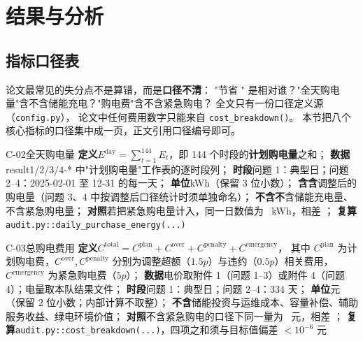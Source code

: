 
\section{结果与分析}

\subsection{指标口径表}

\begin{guideblock}
论文最常见的失分点不是算错，而是\textbf{口径不清}：
"节省 \ph" 是相对谁？"全天购电量"含不含储能充电？"购电费"含不含紧急购电？
全文只有一份口径定义源（\texttt{config.py}），
论文中任何费用数字只能来自 \texttt{cost\_breakdown()}。
本节把八个核心指标的口径集中成一页，正文引用口径编号即可。
\end{guideblock}

\begin{caliber}{C-02}{全天购电量}
\textbf{定义}\quad \(E^{\text{day}}=\sum_{t=1}^{144}E_t\)，即 144 个时段的\textbf{计划购电量}之和；%
\textbf{数据}\quad result1/2/3/4-* 中"计划购电量"工作表的逐时段列；%
\textbf{时段}\quad 问题 1：典型日；问题 2--4：2025-02-01 至 12-31 的每一天；%
\textbf{单位}\quad kWh（保留 3 位小数）；%
\textbf{含}\quad \textbf{含}调整后的购电量（问题 3、4 中按调整后口径统计时须单独命名）；%
\textbf{不含}\quad \textbf{不}含储能充电量、不含紧急购电量；%
\textbf{对照}\quad 若把紧急购电量计入，同一日数值为 \ph~kWh，相差 \ph；%
\textbf{复算}\quad \texttt{audit.py::daily\_purchase\_energy(...)}
\end{caliber}

\begin{caliber}{C-03}{总购电费用}
\textbf{定义}\quad \(C^{\text{total}}=C^{\text{plan}}+C^{\text{over}}+C^{\text{penalty}}%
        +C^{\text{emergency}}\)，%
        其中 \(C^{\text{plan}}\) 为计划购电费，\(C^{\text{over}},C^{\text{penalty}}\)%
        分别为调整超额（\(1.5p\)）与违约（\(0.5p\)）相关费用，%
        \(C^{\text{emergency}}\) 为紧急购电费（\(5p\)）；%
\textbf{数据}\quad 电价取附件 1（问题 1--3）或附件 4（问题 4）；电量取本队结果文件；%
\textbf{时段}\quad 问题 1：典型日；问题 2--4：334 天；%
\textbf{单位}\quad 元（保留 2 位小数；内部计算不取整）；%
\textbf{不含}\quad 储能投资与运维成本、容量补偿、辅助服务收益、绿电环境价值；%
\textbf{对照}\quad 不含紧急购电的口径下同一量为 \ph~元，相差 \ph；%
\textbf{复算}\quad \texttt{audit.py::cost\_breakdown(...)}，四项之和须与目标值偏差 \(<10^{-6}\) 元
\end{caliber}

